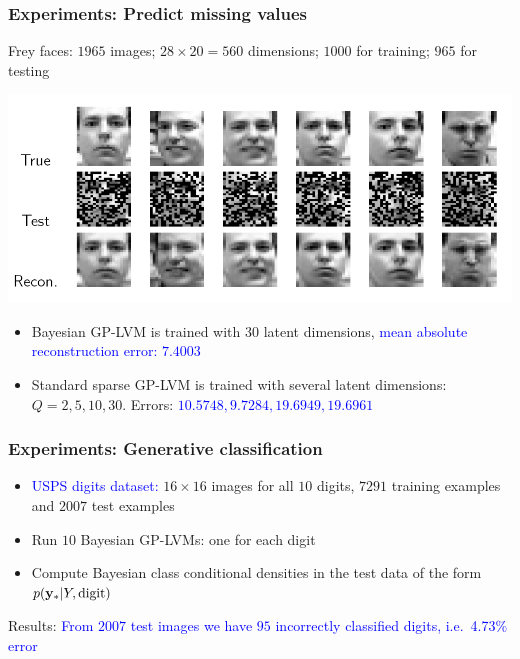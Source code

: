 \documentclass{beamer}
\begin{document}
\frame
{
\frametitle{Experiments: Predict missing values}

Frey faces: $1965$ images; $28 \times 20=560$ dimensions;
 $1000$ for training; $965$ for testing 


\begin{center}
\includegraphics[width=1.1\textheight]
{../../../vargplvm/tex/diagrams/Frey2}
\end{center}

\begin{itemize}

%


\item Bayesian GP-LVM is trained with $30$ latent dimensions, 
     \textcolor{blue}{mean absolute reconstruction error: $7.4003$}


\item Standard sparse GP-LVM is trained with several latent dimensions:
      $Q= 2, 5, 10, 30$. Errors: \textcolor{blue}{$10.5748, 9.7284, 19.6949, 19.6961$}


\end{itemize}   

}

\frame
{
\frametitle{Experiments: Generative classification}

\begin{itemize} 

\item  \textcolor{blue}{USPS digits dataset:} $16 \times 16$ images for all $10$ digits,  $7291$
training examples and $2007$ test examples

\item Run $10$ Bayesian GP-LVMs: one for each digit

\item Compute Bayesian class conditional densities in the test data of
  the form $p(\mathbf{y}_*|Y,\text{digit})$

\end{itemize}

Results: \textcolor{blue}{From $2007$ test images we have $95$ incorrectly
classified digits, i.e.\  4.73\% error}

}
\end{document}

